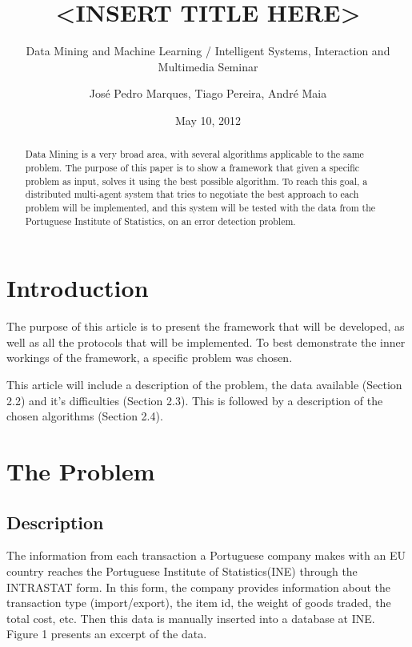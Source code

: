 \documentclass{llncs}
\begin{document}
\title{<INSERT TITLE HERE>}
\subtitle{Data Mining and Machine Learning / Intelligent Systems, Interaction and Multimedia Seminar}
\author{José Pedro Marques, Tiago Pereira, André Maia}
\date{May 10, 2012}
\maketitle

\begin{abstract}
Data Mining is a very broad area, with several algorithms applicable to the same problem. The purpose of this paper is to show a framework that given a specific problem as input, solves it using the best possible algorithm. To reach this goal, a distributed multi-agent system that tries to negotiate the best approach to each problem will be implemented, and this system will be tested with the data from the Portuguese Institute of Statistics, on an error detection problem.
\end{abstract}

\section{Introduction}

The purpose of this article is to present the framework that will be developed, as well as all the protocols that will be implemented. To best demonstrate the inner workings of the framework, a specific problem was chosen.

This article will include a description of the problem, the data available (Section 2.2) and it's difficulties (Section 2.3). This is followed by a description of the chosen algorithms (Section 2.4).

\section{The Problem}

\subsection{Description}

The information from each transaction a Portuguese company makes with an EU country reaches the Portuguese Institute of Statistics(INE) through the INTRASTAT form. In this form, the company provides information  about the transaction type (import/export), the item id, the weight of goods traded, the total cost, etc. Then this data is manually inserted into a database at INE. Figure 1 presents an excerpt of the data.
\end{document}
